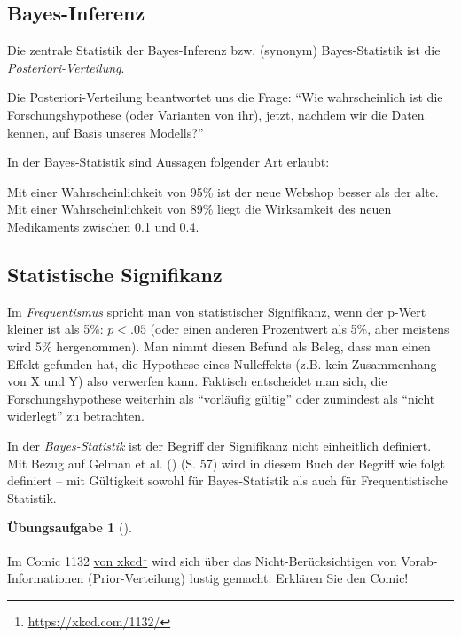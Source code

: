 \documentclass[
  ngerman,
  letterpaper,
  twoside,
  open=any]{scrbook}
\theoremstyle{definition}
\theoremstyle{plain}
\theoremstyle{definition}
\newtheorem{exercise}{Übungsaufgabe}[chapter]
\theoremstyle{definition}
\theoremstyle{remark}
\begin{document}
\subsection{Bayes-Inferenz}\label{bayes-inferenz}

Die zentrale Statistik der Bayes-Inferenz bzw. (synonym) Bayes-Statistik
ist die \emph{Posteriori-Verteilung}.

Die Posteriori-Verteilung beantwortet uns die Frage: \enquote{Wie
wahrscheinlich ist die Forschungshypothese (oder Varianten von ihr),
jetzt, nachdem wir die Daten kennen, auf Basis unseres Modells?}

In der Bayes-Statistik sind Aussagen folgender Art erlaubt:

\begin{displayquote}
Mit einer Wahrscheinlichkeit von 95\% ist der neue Webshop besser als
der alte. Mit einer Wahrscheinlichkeit von 89\% liegt die Wirksamkeit
des neuen Medikaments zwischen 0.1 und 0.4.
\end{displayquote}

\subsection{Statistische Signifikanz}\label{statistische-signifikanz}

Im \emph{Frequentismus} spricht man von statistischer Signifikanz, wenn
der p-Wert kleiner ist als 5\%: \(p<.05\) (oder einen anderen
Prozentwert als 5\%, aber meistens wird 5\% hergenommen). Man nimmt
diesen Befund als Beleg, dass man einen Effekt gefunden hat, die
Hypothese eines Nulleffekts (z.B. kein Zusammenhang von X und Y) also
verwerfen kann. Faktisch entscheidet man sich, die Forschungshypothese
weiterhin als \enquote{vorläufig gültig} oder zumindest als
\enquote{nicht widerlegt} zu betrachten.

In der \emph{Bayes-Statistik} ist der Begriff der Signifikanz nicht
einheitlich definiert. Mit Bezug auf Gelman et al.
() (S. 57) wird in diesem Buch der
Begriff wie folgt definiert -- mit Gültigkeit sowohl für Bayes-Statistik
als auch für Frequentistische Statistik.

\begin{exercise}[]\protect\hypertarget{exr-sun-explodes}{}\label{exr-sun-explodes}

Im Comic 1132 \href{https://xkcd.com/1132/}{von xkcd}\footnote{\url{https://xkcd.com/1132/}}
wird sich über das Nicht-Berücksichtigen von Vorab-Informationen
(Prior-Verteilung) lustig gemacht. Erklären Sie den Comic!

\end{exercise}
\end{document}
